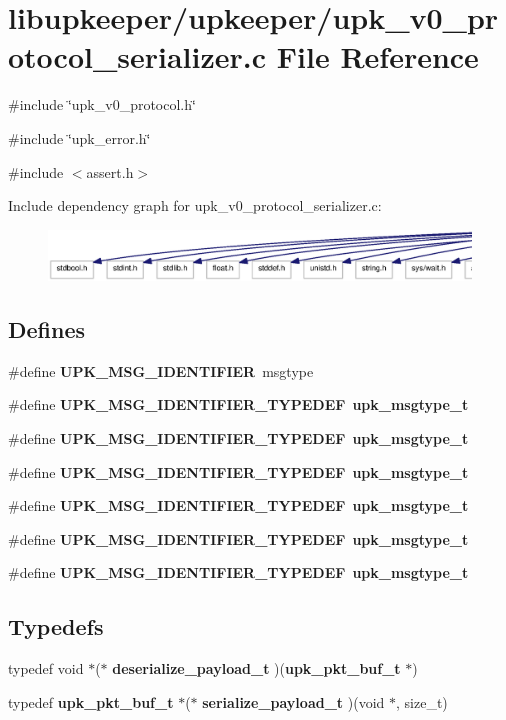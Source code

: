 \section{libupkeeper/upkeeper/upk\_\-v0\_\-protocol\_\-serializer.c File Reference}
\label{upk__v0__protocol__serializer_8c}
{\ttfamily \#include \char`\"{}upk\_\-v0\_\-protocol.h\char`\"{}}\par
{\ttfamily \#include \char`\"{}upk\_\-error.h\char`\"{}}\par
{\ttfamily \#include $<$assert.h$>$}\par
Include dependency graph for upk\_\-v0\_\-protocol\_\-serializer.c:\nopagebreak
\begin{figure}[H]
\begin{center}
\leavevmode
\includegraphics[width=400pt]{upk__v0__protocol__serializer_8c__incl}
\end{center}
\end{figure}
\subsection*{Defines}
\begin{DoxyCompactItemize}
\item 
\#define {\bf UPK\_\-MSG\_\-IDENTIFIER}~msgtype
\item 
\#define {\bf UPK\_\-MSG\_\-IDENTIFIER\_\-TYPEDEF}~{\bf upk\_\-msgtype\_\-t}
\item 
\#define {\bf UPK\_\-MSG\_\-IDENTIFIER\_\-TYPEDEF}~{\bf upk\_\-msgtype\_\-t}
\item 
\#define {\bf UPK\_\-MSG\_\-IDENTIFIER\_\-TYPEDEF}~{\bf upk\_\-msgtype\_\-t}
\item 
\#define {\bf UPK\_\-MSG\_\-IDENTIFIER\_\-TYPEDEF}~{\bf upk\_\-msgtype\_\-t}
\item 
\#define {\bf UPK\_\-MSG\_\-IDENTIFIER\_\-TYPEDEF}~{\bf upk\_\-msgtype\_\-t}
\item 
\#define {\bf UPK\_\-MSG\_\-IDENTIFIER\_\-TYPEDEF}~{\bf upk\_\-msgtype\_\-t}
\end{DoxyCompactItemize}
\subsection*{Typedefs}
\begin{DoxyCompactItemize}
\item 
typedef void $\ast$($\ast$ {\bf deserialize\_\-payload\_\-t} )({\bf upk\_\-pkt\_\-buf\_\-t} $\ast$)
\item 
typedef {\bf upk\_\-pkt\_\-buf\_\-t} $\ast$($\ast$ {\bf serialize\_\-payload\_\-t} )(void $\ast$, size\_\-t)
\end{DoxyCompactItemize}
